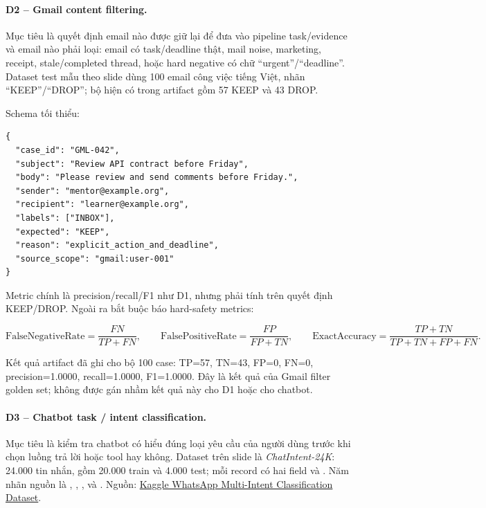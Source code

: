 \documentclass[12pt,a4paper]{article}
\begin{document}
\paragraph{D2 -- Gmail content filtering.}
Mục tiêu là quyết định email nào được giữ lại để đưa vào pipeline task/evidence
và email nào phải loại: email có task/deadline thật, mail noise, marketing,
receipt, stale/completed thread, hoặc hard negative có chữ ``urgent''/``deadline''.
Dataset test mẫu theo slide dùng 100 email công việc tiếng Việt, nhãn
``KEEP''/``DROP''; bộ hiện có trong artifact gồm 57 KEEP và 43 DROP.

Schema tối thiểu:

\begin{verbatim}
{
  "case_id": "GML-042",
  "subject": "Review API contract before Friday",
  "body": "Please review and send comments before Friday.",
  "sender": "mentor@example.org",
  "recipient": "learner@example.org",
  "labels": ["INBOX"],
  "expected": "KEEP",
  "reason": "explicit_action_and_deadline",
  "source_scope": "gmail:user-001"
}
\end{verbatim}

Metric chính là precision/recall/F1 như D1, nhưng phải tính trên quyết định
KEEP/DROP. Ngoài ra bắt buộc báo hard-safety metrics:

\[
\mathrm{FalseNegativeRate}=\frac{FN}{TP+FN},\qquad
\mathrm{FalsePositiveRate}=\frac{FP}{FP+TN},\qquad
\mathrm{ExactAccuracy}=\frac{TP+TN}{TP+TN+FP+FN}.
\]

Kết quả artifact đã ghi cho bộ 100 case: TP=57, TN=43, FP=0, FN=0,
precision=1.0000, recall=1.0000, F1=1.0000. Đây là kết quả của Gmail filter
golden set; không được gán nhầm kết quả này cho D1 hoặc cho chatbot.

\paragraph{D3 -- Chatbot task / intent classification.}
Mục tiêu là kiểm tra chatbot có hiểu đúng loại yêu cầu của người dùng trước khi
chọn luồng trả lời hoặc tool hay không. Dataset trên slide là
\emph{ChatIntent-24K}: 24.000 tin nhắn, gồm 20.000 train và 4.000 test; mỗi
record có hai field  và . Năm nhãn nguồn là
, , ,
 và . Nguồn:
\href{https://www.kaggle.com/datasets/deepamchaudhary/whatsapp-multi-intent-classification-dataset}{Kaggle
WhatsApp Multi-Intent Classification Dataset}.
\end{document}
